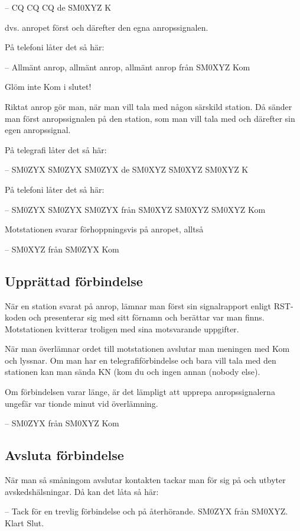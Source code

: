 -- CQ CQ CQ de SM0XYZ K

dvs. anropet först och därefter den egna anropssignalen.

På telefoni låter det så här:

-- Allmänt anrop, allmänt anrop, allmänt anrop från SM0XYZ Kom

Glöm inte Kom i slutet!

Riktat anrop gör man, när man vill tala med någon särskild station.
Då sänder man först anropssignalen på den station, som man vill tala med och
därefter sin egen anropssignal.

På telegrafi låter det så här:

-- SM0ZYX SM0ZYX SM0ZYX de SM0XYZ SM0XYZ SM0XYZ K

På telefoni låter det så här:

-- SM0ZYX SM0ZYX SM0ZYX från SM0XYZ SM0XYZ SM0XYZ Kom

Motstationen svarar förhoppningsvis på anropet, alltså

-- SM0XYZ från SM0ZYX Kom

\subsection{Upprättad förbindelse}

När en station svarat på anrop, lämnar man först sin signalrapport
enligt RST-koden och presenterar sig med sitt förnamn och berättar var man finns.
Motstationen kvitterar troligen med sina motsvarande uppgifter.

När man överlämnar ordet till motstationen avslutar man meningen med Kom och lyssnar.
Om man har en telegrafiförbindelse och bara vill tala med den stationen kan man
sända KN (kom du och ingen annan (nobody else).

Om förbindelsen varar länge, är det lämpligt att upprepa anropssignalerna
ungefär var tionde minut vid överlämning.

-- SM0ZYX från SM0XYZ Kom

\subsection{Avsluta förbindelse}

När man så småningom avslutar kontakten tackar man för sig på och utbyter avskedshälsningar. Då kan det låta så här:

-- Tack för en trevlig förbindelse och på återhörande. SM0ZYX från
SM0XYZ. Klart Slut.

